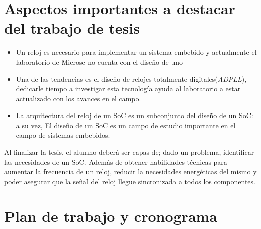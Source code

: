 \documentclass[runningheads,a4paper]{llncs}
\begin{document}
\section{Aspectos importantes a destacar del trabajo de tesis}
\begin{itemize}
\settowidth{\leftmargin}{{\Large$\circ$}}\advance\leftmargin{}
\itemsep8pt\relax
\renewcommand\labelitemi{{\lower1.5pt\hbox{\Large$\circ$}}}

     \item Un reloj es necesario para implementar un sistema embebido y actualmente el laboratorio de Microse no cuenta con el diseño de uno

     \item Una de las tendencias es el diseño de relojes totalmente digitales(\textit{ADPLL}), dedicarle tiempo a investigar esta tecnología ayuda al laboratorio a estar actualizado con los avances en el campo.

     \item La arquitectura del reloj de un SoC es un subconjunto del diseño de un SoC: a su vez, El diseño de un SoC es un campo de estudio importante en el campo de sistemas embebidos.

 \end{itemize}
Al finalizar la tesis, el alumno deberá ser capas de; dado un problema, identificar las necesidades de un SoC. Además de obtener habilidades técnicas para aumentar la frecuencia de un reloj, reducir la necesidades energéticas del mismo y poder asegurar que la señal del reloj llegue sincronizada a todos los componentes. 

\section{Plan de trabajo y cronograma}
\end{document}
